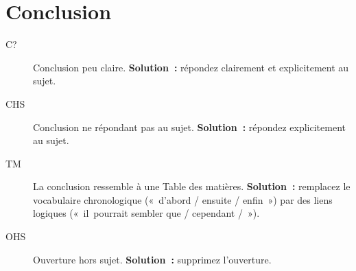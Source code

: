 \documentclass[a4paper,11pt]{article}
\begin{document}
\section{Conclusion}
\label{sec:orgce6cb82}
\begin{description}
\item[{C\string?}] Conclusion peu claire. \textbf{Solution :} répondez clairement
et explicitement au sujet.
\item[{CHS}] Conclusion ne répondant pas au sujet. \textbf{Solution :} répondez
explicitement au sujet.
\item[{TM}] La conclusion ressemble à une Table des matières. \textbf{Solution :}
remplacez le vocabulaire chronologique (« d'abord / ensuite
/ enfin ») par des liens logiques (« il pourrait sembler que
/ cependant / »).
\item[{OHS}] Ouverture hors sujet. \textbf{Solution :} supprimez l'ouverture.
\end{description}
\end{document}
